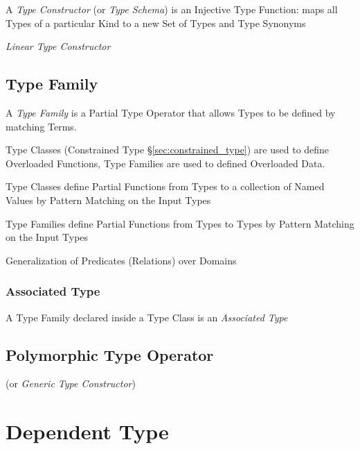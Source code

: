 A \emph{Type Constructor} (or \emph{Type Schema}) is an Injective Type
Function: maps all Types of a particular Kind to a new Set of Types
and Type Synonyms

\emph{Linear Type Constructor} %



\subsection{Type Family}\label{sec:type_family}

A \emph{Type Family} is a Partial Type Operator that allows Types to
be defined by matching Terms.


Type Classes (Constrained Type \S\ref{sec:constrained_type}) are used
to define Overloaded Functions, Type Families are used to defined
Overloaded Data.

Type Classes define Partial Functions from Types to a collection of
Named Values by Pattern Matching on the Input Types

Type Families define Partial Functions from Types to Types by Pattern
Matching on the Input Types

Generalization of Predicates (Relations) over Domains



\subsubsection{Associated Type}\label{sec:associated_type}

A Type Family declared inside a Type Class is an \emph{Associated
  Type}



\subsection{Polymorphic Type Operator}
\label{sec:polymorphic_type_operator}

(or \emph{Generic Type Constructor})



\section{Dependent Type}\label{sec:dependent_type}

